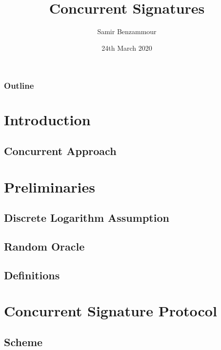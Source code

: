 \documentclass{beamer}
\title{Concurrent Signatures}
\author{Samir Benzammour}
\date{24th March 2020}
\institute[RWTH]{
  Algorithms and Computational Complexity\\
  RWTH Aachen University
}
\begin{document}
\frame{\titlepage}

\begin{frame}
	\frametitle{Outline}
	\tableofcontents
\end{frame}

\section{Introduction}


\subsection{Concurrent Approach}


\section{Preliminaries}

\subsection{Discrete Logarithm Assumption}


\subsection{Random Oracle}


\subsection{Definitions}


\section{Concurrent Signature Protocol}

\subsection{Scheme}

\end{document}

